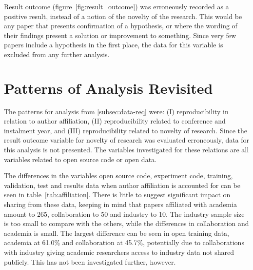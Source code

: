 Result outcome (figure~\ref{fig:result_outcome}) was erroneously recorded as a positive result, instead of a notion of the novelty of the research. This would be any paper that presents confirmation of a hypothesis, or where the wording of their findings present a solution or improvement to something. Since very few papers include a hypothesis in the first place, the data for this variable is excluded from any further analysis.
\clearpage

\section{Patterns of Analysis Revisited}
The patterns for analysis from \ref{subsec:data-req} were: (I) reproducibility in relation to author affiliation, (II) reproducibility related to conference and instalment year, and (III) reproducibility related to novelty of research. Since the result outcome variable for novelty of research was evaluated erroneously, data for this analysis is not presented. The variables investigated for these relations are all variables related to open source code or open data.

The differences in the variables open source code, experiment code, training, validation, test and results data when author affiliation is accounted for can be seen in table~\ref{tab:affiliation}. There is little to suggest significant impact on sharing from these data, keeping in mind that papers affiliated with academia amount to 265, collaboration to 50 and industry to 10. The industry sample size is too small to compare with the others, while the differences in collaboration and academia is small. The largest difference can be seen in open training data, academia at 61.0\% and collaboration at 45.7\%, potentially due to collaborations with industry giving academic researchers access to industry data not shared publicly. This has not been investigated further, however.

